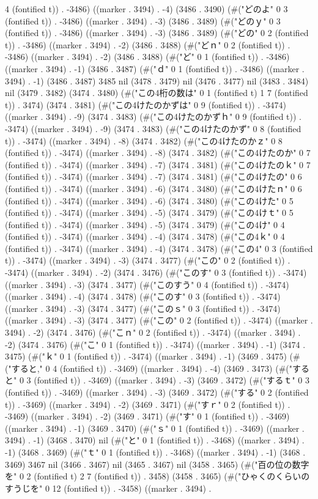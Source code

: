 4 (fontified t)) . -3486) ((marker . 3494) . -4) (3486 . 3490) (#("どのよ" 0 3 (fontified t)) . -3486) ((marker . 3494) . -3) (3486 . 3489) (#("どのｙ" 0 3 (fontified t)) . -3486) ((marker . 3494) . -3) (3486 . 3489) (#("どの" 0 2 (fontified t)) . -3486) ((marker . 3494) . -2) (3486 . 3488) (#("どｎ" 0 2 (fontified t)) . -3486) ((marker . 3494) . -2) (3486 . 3488) (#("ど" 0 1 (fontified t)) . -3486) ((marker . 3494) . -1) (3486 . 3487) (#("ｄ" 0 1 (fontified t)) . -3486) ((marker . 3494) . -1) (3486 . 3487) 3485 nil (3478 . 3479) nil (3476 . 3477) nil (3483 . 3484) nil (3479 . 3482) (3474 . 3480) (#("この4桁の数は" 0 1 (fontified t) 1 7 (fontified t)) . 3474) (3474 . 3481) (#("この4けたのかずは" 0 9 (fontified t)) . -3474) ((marker . 3494) . -9) (3474 . 3483) (#("この4けたのかずｈ" 0 9 (fontified t)) . -3474) ((marker . 3494) . -9) (3474 . 3483) (#("この4けたのかず" 0 8 (fontified t)) . -3474) ((marker . 3494) . -8) (3474 . 3482) (#("この4けたのかｚ" 0 8 (fontified t)) . -3474) ((marker . 3494) . -8) (3474 . 3482) (#("この4けたのか" 0 7 (fontified t)) . -3474) ((marker . 3494) . -7) (3474 . 3481) (#("この4けたのｋ" 0 7 (fontified t)) . -3474) ((marker . 3494) . -7) (3474 . 3481) (#("この4けたの" 0 6 (fontified t)) . -3474) ((marker . 3494) . -6) (3474 . 3480) (#("この4けたｎ" 0 6 (fontified t)) . -3474) ((marker . 3494) . -6) (3474 . 3480) (#("この4けた" 0 5 (fontified t)) . -3474) ((marker . 3494) . -5) (3474 . 3479) (#("この4けｔ" 0 5 (fontified t)) . -3474) ((marker . 3494) . -5) (3474 . 3479) (#("この4け" 0 4 (fontified t)) . -3474) ((marker . 3494) . -4) (3474 . 3478) (#("この4ｋ" 0 4 (fontified t)) . -3474) ((marker . 3494) . -4) (3474 . 3478) (#("この4" 0 3 (fontified t)) . -3474) ((marker . 3494) . -3) (3474 . 3477) (#("この" 0 2 (fontified t)) . -3474) ((marker . 3494) . -2) (3474 . 3476) (#("このす" 0 3 (fontified t)) . -3474) ((marker . 3494) . -3) (3474 . 3477) (#("このすう" 0 4 (fontified t)) . -3474) ((marker . 3494) . -4) (3474 . 3478) (#("このす" 0 3 (fontified t)) . -3474) ((marker . 3494) . -3) (3474 . 3477) (#("このｓ" 0 3 (fontified t)) . -3474) ((marker . 3494) . -3) (3474 . 3477) (#("この" 0 2 (fontified t)) . -3474) ((marker . 3494) . -2) (3474 . 3476) (#("こｎ" 0 2 (fontified t)) . -3474) ((marker . 3494) . -2) (3474 . 3476) (#("こ" 0 1 (fontified t)) . -3474) ((marker . 3494) . -1) (3474 . 3475) (#("ｋ" 0 1 (fontified t)) . -3474) ((marker . 3494) . -1) (3469 . 3475) (#("すると," 0 4 (fontified t)) . -3469) ((marker . 3494) . -4) (3469 . 3473) (#("すると" 0 3 (fontified t)) . -3469) ((marker . 3494) . -3) (3469 . 3472) (#("するｔ" 0 3 (fontified t)) . -3469) ((marker . 3494) . -3) (3469 . 3472) (#("する" 0 2 (fontified t)) . -3469) ((marker . 3494) . -2) (3469 . 3471) (#("すｒ" 0 2 (fontified t)) . -3469) ((marker . 3494) . -2) (3469 . 3471) (#("す" 0 1 (fontified t)) . -3469) ((marker . 3494) . -1) (3469 . 3470) (#("ｓ" 0 1 (fontified t)) . -3469) ((marker . 3494) . -1) (3468 . 3470) nil (#("と" 0 1 (fontified t)) . -3468) ((marker . 3494) . -1) (3468 . 3469) (#("ｔ" 0 1 (fontified t)) . -3468) ((marker . 3494) . -1) (3468 . 3469) 3467 nil (3466 . 3467) nil (3465 . 3467) nil (3458 . 3465) (#("百の位の数字を" 0 2 (fontified t) 2 7 (fontified t)) . 3458) (3458 . 3465) (#("ひゃくのくらいのすうじを" 0 12 (fontified t)) . -3458) ((marker . 3494) . 